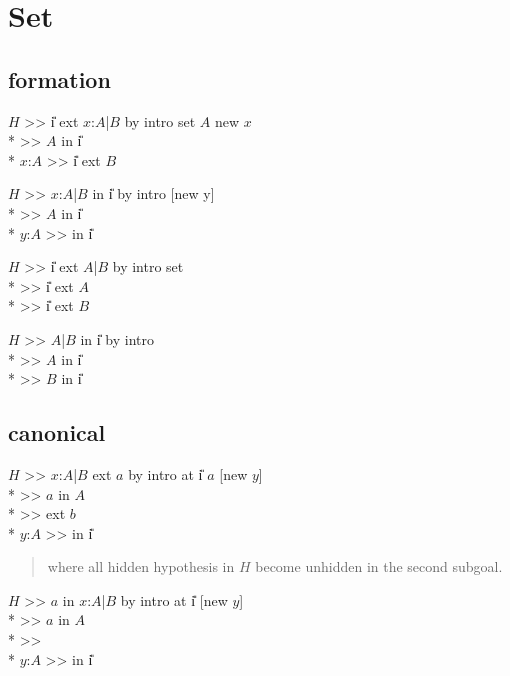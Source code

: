 \section{Set}
\subsection*{formation}
\goal $H$ >> \U{i} ext \lc$x$:$A$|$B$\rc{} by intro set $A$ new $x$ \\*
\subgoal >> $A$ in \U{i} \\*
\subgoal $x$:$A$ >> \U{i} ext $B$


\goalskip

\goal $H$ >> \lc $x$:$A$|$B$\rc{} in \U{i} by intro [new y]\\*
\subgoal >> $A$ in \U{i} \\*
\subgoal $y$:$A$ >>  in \U{i}

\goalskip

\goal $H$ >> \U{i} ext \lc$A$|$B$\rc{} by intro set \\*
\subgoal >> \U{i} ext $A$\\*
\subgoal >> \U{i} ext $B$


\goalskip

\goal $H$ >> \lc $A$|$B$\rc{} in \U{i} by intro \\*
\subgoal >> $A$ in \U{i} \\*
\subgoal >> $B$ in \U{i}

\subsection*{canonical}
\goal $H$ >> \lc $x$:$A$|$B$\rc{} ext $a$ by intro at \U{i} $a$ [new $y$]\\*
\subgoal >> $a$ in $A$ \\* 
\subgoal >>  ext $b$\\*
\subgoal $y$:$A$ >>  in \U{i}
\begin{quote}\rm where all hidden hypothesis in $H$ become unhidden in the second
subgoal.
\end{quote}

\goal $H$ >> $a$ in \lc$x$:$A$|$B$\rc{} by intro at \U{i} [new $y$]\\*
\subgoal >> $a$ in $A$ \\*
\subgoal >> \\*
\subgoal $y$:$A$ >>  in \U{i}


\goalskip


